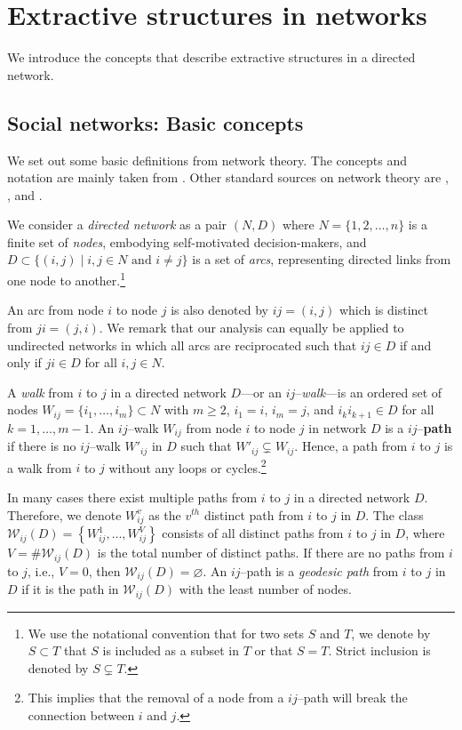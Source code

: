 \section{Extractive structures in networks}

We introduce the concepts that describe extractive structures in a directed network.

\subsection{Social networks: Basic concepts}

We set out some basic definitions from network theory. The concepts and notation are mainly taken from \citet{Jackson2008}. Other standard sources on network theory are \citet{Newman2006book}, \citet{Goyal2007}, \citet{Newman2010} and \citet{Gilles2010}.

We consider a \emph{directed network} as a pair $(N,D)$ where $N=\{1 , 2 , \ldots , n\}$ is a finite set of \emph{nodes}, embodying self-motivated decision-makers, and $D \subset \{(i,j) \mid i,j \in N \mbox{ and } i \neq j\}$ is a set of \emph{arcs}, representing directed links from one node to another.\footnote{We use the notational convention that for two sets $S$ and $T$, we denote by $S \subset T$ that $S$ is included as a subset in $T$ or that $S=T$. Strict inclusion is denoted by $S \subsetneq T$.}

An arc from node $i$ to node $j$ is also denoted by $ij = (i,j)$ which is distinct from $ji = (j,i)$. We remark that our analysis can equally be applied to undirected networks in which all arcs are reciprocated such that $ij \in D$ if and only if $ji \in D$ for all $i,j \in N$.

A \textit{walk} from $i$ to $j$ in a directed network $D$---or an $ij$--\textit{walk}---is an ordered set of nodes $W_{ij} = \{ i_{1}, \ldots ,i_{m} \} \subset N$ with $m \geq 2$, $i_1 =i$, $i_m =j$, and $i_{k}i_{k+1} \in D$ for all $k=1, \ldots ,m-1$. An $ij$--walk $W_{ij}$ from node $i$ to node $j$ in network $D$ is a $ij$--\textbf{path} if there is no $ij$--walk $W'_{ij}$ in $D$ such that $W'_{ij} \subsetneq W_{ij}$. Hence, a path from $i$ to $j$ is a walk from $i$ to $j$ without any loops or cycles.\footnote{This implies that the removal of a node from a $ij$--path will break the connection between $i$ and $j$.}

In many cases there exist multiple paths from $i$ to $j$ in a directed network $D$. Therefore, we denote $W_{ij}^{v}$ as the $v^{th}$ distinct path from $i$ to $j$ in $D$. The class $\mathcal{W}_{ij} (D) = \left\{ W_{ij}^{1}, \ldots ,W_{ij}^{V} \right\}$ consists of all distinct paths from $i$ to $j$ in $D$, where $V = \# \mathcal{W}_{ij}(D)$ is the total number of distinct paths.  If there are no paths from $i$ to $j$, i.e., $V=0$, then $\mathcal{W}_{ij}(D)= \varnothing$. An $ij$--path is a \emph{geodesic path} from $i$ to $j$ in $D$ if it is the path in $\mathcal{W}_{ij} (D)$ with the least number of nodes.

